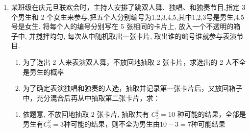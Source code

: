 \begin{enumerate}
\begin{enumerate}
\begin{jieda}
\begin{enumerate}

                综上所述: 游戏经过两局后甲恰得 3 分且为唯一获胜者的概率 ${P}_{2} = \dfrac{1}{81} + \dfrac{1}{81} = \dfrac{2}{81}$
            \end{enumerate}
        \end{jieda}
        \item 某班级在庆元旦联欢会时，主持人安排了跳双人舞、独唱、和独奏节目,指定 3 个男生和 2 个女生来参与,把五个人分别编号为1,2,3,4,5,其中1,2,3号是男生,4,5 号是女生. 将每个人的编号分别写在 5 张相同的卡片上, 放入一个不透明的箱子中, 并搅拌均匀, 每次从中随机取出一张卡片, 取出谁的编号谁就参与表演节目.
        \begin{enumerate}
            \item 为了选出 2 人来表演双人舞，不放回地抽取 2 张卡片，求选出的 2 人不全是男生的概率
            \item 为了确定表演独唱和独奏的人选，抽取并记录第一张卡片后，又放回箱子中，充分混合后再从中抽取第二张卡片，求：
        \end{enumerate}
        \begin{jieda}
            \begin{enumerate}
                \item 依题意, 不放回地抽取 2 张卡片, 抽取共有 $C_5^2 = 10$ 种可能的结果，全部是男生有$C_3^2 = 3$种可能的结果，则不全为男生由$10-3=7$种可能结果


\end{enumerate}
\end{jieda}
\end{enumerate}
\end{enumerate}
